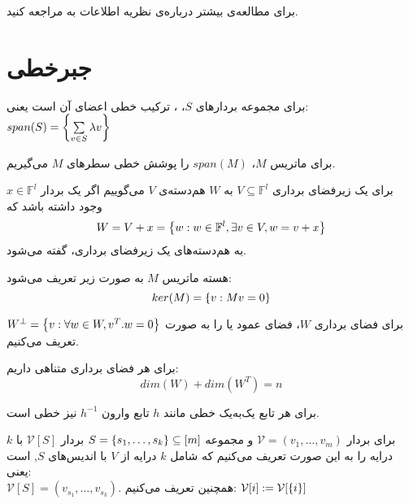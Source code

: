 	برای مطالعه‌ی بیشتر درباره‌ی نظریه اطلاعات به
\cite{book:info}
مراجعه کنید.
\section{جبرخطی}
\begin{definition}
	برای مجموعه بردار‌های
	$S$، ،
	ترکیب خطی اعضای آن است یعنی:
	$span(S) = \left\{  \sum\limits_{v \in S} \lambda v \right\}$
	
	برای ماتریس
	$M$، $span(M)$
را پوشش خطی سطرهای 
$M$
می‌گیریم.
\end{definition}

\begin{definition}[هم‌دسته]
	\label{coset}
	برای یک زیرفضای برداری
	$V \subseteq \mathbb{F}^l$
	به
	$W$
	هم‌دسته‌‌‌ی
	$V$
	می‌گوییم اگر یک بردار
	$x \in \mathbb{F}^l$
	وجود داشته باشد که
	$$W = V + x = \left\{ w: w \in \mathbb{F}^l, \exists v \in V, w = v + x \right\}$$
	به هم‌دسته‌های یک زیرفضای برداری،
	گفته می‌شود.
\end{definition}
\begin{definition}
	هسته ماتریس
	$M$
	به صورت زیر تعریف می‌شود:
	$$ker(M) = \left\{ v: Mv = 0 \right\}$$
\end{definition}
\begin{definition}
برای فضای برداری
$W$،
فضای عمود یا 
 را به صورت
$W^\bot = \left\{ v: \forall w \in W, v^T.w = 0 \right\}$
تعریف می‌کنیم.
\end{definition}

\begin{theorem}
	برای هر فضای برداری متناهی داریم:
	$$dim(W) + dim(W^T) = n$$
\end{theorem}
\begin{remark}
	برای هر تابع یک‌به‌یک خطی مانند
	$h$
	تابع وارون 
	$h^{-1}$
	نیز خطی است.
\end{remark}
\begin{notation}
برای بردار
$\mathcal{V} = (v_1, \ldots, v_m)$ 
و مجموعه
$S = \left\{ s_1, \ldots, s_k \right\} \subseteq [m]$
بردار
$\mathcal{V} [S]$ 
با 
$k$ درایه 
را به این صورت تعریف می‌کنیم که شامل
$k$ 
درایه از
$V$ 
با اندیس‌های
$S$, 
است یعنی:\\
$\mathcal{V} [S] = (v_{s_1}, \ldots, v_{s_k})$.
همچنین تعریف می‌کنیم:
$\mathcal{V} [i] := \mathcal{V} [{\left\{ i \right\}}]$
\end{notation}

